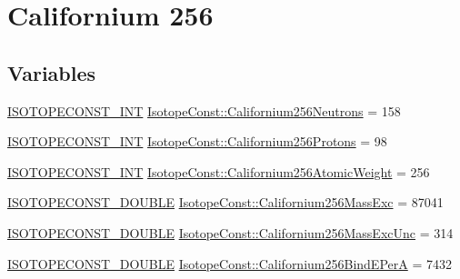 \hypertarget{group___isotope_const-_californium-_cf256}{}\section{Californium 256}
\label{group___isotope_const-_californium-_cf256}
\subsection*{Variables}
\begin{DoxyCompactItemize}
\item 
\mbox{\hyperlink{group___isotope_const-_macros_ga5f18360b3e99483a35c32d789e62621c}{I\+S\+O\+T\+O\+P\+E\+C\+O\+N\+S\+T\+\_\+\+I\+NT}} \mbox{\hyperlink{group___isotope_const-_californium-_cf256_gae6204b529a404a3d800691d3c79f3e51}{Isotope\+Const\+::\+Californium256\+Neutrons}} = 158
\item 
\mbox{\hyperlink{group___isotope_const-_macros_ga5f18360b3e99483a35c32d789e62621c}{I\+S\+O\+T\+O\+P\+E\+C\+O\+N\+S\+T\+\_\+\+I\+NT}} \mbox{\hyperlink{group___isotope_const-_californium-_cf256_gaa07bbb0acc3dd8cf9d898ca97b81db21}{Isotope\+Const\+::\+Californium256\+Protons}} = 98
\item 
\mbox{\hyperlink{group___isotope_const-_macros_ga5f18360b3e99483a35c32d789e62621c}{I\+S\+O\+T\+O\+P\+E\+C\+O\+N\+S\+T\+\_\+\+I\+NT}} \mbox{\hyperlink{group___isotope_const-_californium-_cf256_ga0c7e98c0070eeca82b969239fa01aeaa}{Isotope\+Const\+::\+Californium256\+Atomic\+Weight}} = 256
\item 
\mbox{\hyperlink{group___isotope_const-_macros_ga8f45a7272ce02c0b4c65c44636ed719a}{I\+S\+O\+T\+O\+P\+E\+C\+O\+N\+S\+T\+\_\+\+D\+O\+U\+B\+LE}} \mbox{\hyperlink{group___isotope_const-_californium-_cf256_gaa630565f9267a0e96064279c54499c0c}{Isotope\+Const\+::\+Californium256\+Mass\+Exc}} = 87041
\item 
\mbox{\hyperlink{group___isotope_const-_macros_ga8f45a7272ce02c0b4c65c44636ed719a}{I\+S\+O\+T\+O\+P\+E\+C\+O\+N\+S\+T\+\_\+\+D\+O\+U\+B\+LE}} \mbox{\hyperlink{group___isotope_const-_californium-_cf256_gae105a396bc8cb4dc9a4ada62b04a8119}{Isotope\+Const\+::\+Californium256\+Mass\+Exc\+Unc}} = 314
\item 
\mbox{\hyperlink{group___isotope_const-_macros_ga8f45a7272ce02c0b4c65c44636ed719a}{I\+S\+O\+T\+O\+P\+E\+C\+O\+N\+S\+T\+\_\+\+D\+O\+U\+B\+LE}} \mbox{\hyperlink{group___isotope_const-_californium-_cf256_ga7961638f88bae956e5c2d4f42b1509fd}{Isotope\+Const\+::\+Californium256\+Bind\+E\+PerA}} = 7432
\item 

\end{DoxyCompactItemize}

